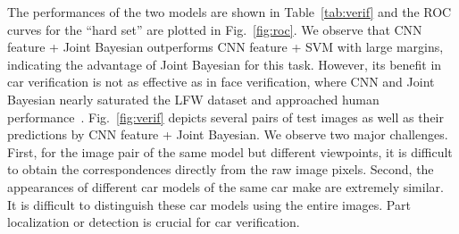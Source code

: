 \documentclass[10pt,twocolumn,letterpaper]{article}
\begin{document}

The performances of the two models are shown in Table~\ref{tab:verif} and the ROC curves for the ``hard set'' are plotted in Fig.~\ref{fig:roc}.
%
We observe that CNN feature + Joint Bayesian outperforms CNN feature + SVM with large margins, indicating the advantage of Joint Bayesian for this task.
%
However, its benefit in car verification is not as effective as in face verification, where CNN and Joint Bayesian nearly saturated the LFW dataset \cite{LFWTech} and approached human performance~\cite{Sun14}.
%
Fig.~\ref{fig:verif} depicts several pairs of test images as well as their predictions by CNN feature + Joint Bayesian. We observe two major challenges. First, for the image pair of the same model but different viewpoints, it is difficult to obtain the correspondences directly from the raw image pixels. Second, the appearances of different car models of the same car make are extremely similar. It is difficult to distinguish these car models using the entire images. Part localization or detection is crucial for car verification.

%
\end{document}
